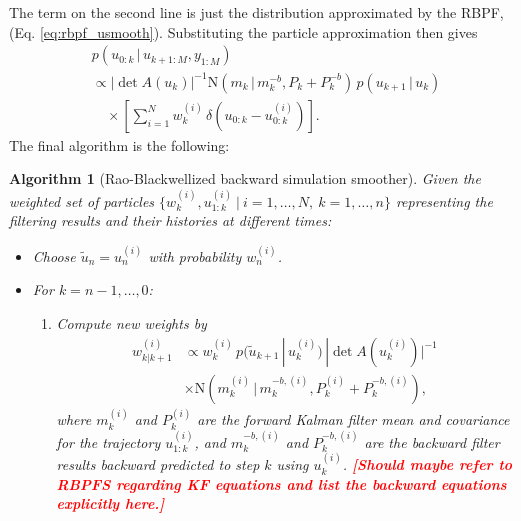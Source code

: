 \documentclass[twocolumn]{autart}    %
\newcommand{\comment}[1]{\textcolor{red}{\textbf{[#1]}}}
\newtheorem{algo}{Algorithm}[section]
\begin{document}
%
The term on the second line is just the distribution approximated by
the RBPF, (Eq. \eqref{eq:rbpf_usmooth}). Substituting the particle
approximation then gives
%
\begin{equation}
\begin{split}
  &p(u_{0:k}\,|\,u_{k+1:M},y_{1:M}) \\
  &\propto
  |\det A(u_k)|^{-1} 
  \mathrm{N}(m_k\,|\,m^{-b}_{k},P_k+P^{-b}_{k}) \, p(u_{k+1}\,|\,u_{k}) \\  
  &\quad \times  
  \left[ \sum_{i=1}^N w^{(i)}_k \, \delta(u_{0:k} - u^{(i)}_{0:k}) \right].
\end{split}
\label{eq:rbbacksimeq}
\end{equation}
%
The final algorithm is the following:
%
\begin{algo}[Rao-Blackwellized backward simulation smoother]
  \label{alg:rbbssmooth}
  Given the weighted set of particles $\{ w_k^{(i)}, u_{1:k}^{(i)} ~|~
  i=1,\ldots,N,~k=1,\ldots,n \}$ representing the filtering results
  and their histories at different times:
\begin{itemize}
\item Choose $\tilde{u}_n = u_n^{(i)}$ with probability $w^{(i)}_{n}$.
\item For $k=n-1,\ldots,0$:
\begin{enumerate}
  \item Compute new weights by
    \begin{equation}
      \begin{split}
        w^{(i)}_{k|k+1} &\propto
        w_k^{(i)} \,
        p(\tilde{u}_{k+1}\,|\,u_{k}^{(i)}) \,
        |\det A(u_k^{(i)})|^{-1} \\
        &\times 
        \mathrm{N}(m^{(i)}_k \,|\,m^{-b,(i)}_{k},P^{(i)}_k+P^{-b,(i)}_{k}),
     \end{split}
    \end{equation}
    where $m^{(i)}_k$ and $P^{(i)}_k$ are the forward Kalman filter
    mean and covariance for the trajectory $u_{1:k}^{(i)}$, and
    $m^{-b,(i)}_{k}$ and $P^{-b,(i)}_{k}$ are the backward filter
    results backward predicted to step $k$ using $u_k^{(i)}$.
   \comment{Should maybe refer to RBPFS regarding KF equations
   and list the backward equations explicitly here.}


\end{enumerate}
\end{itemize}
\end{algo}
\end{document}

